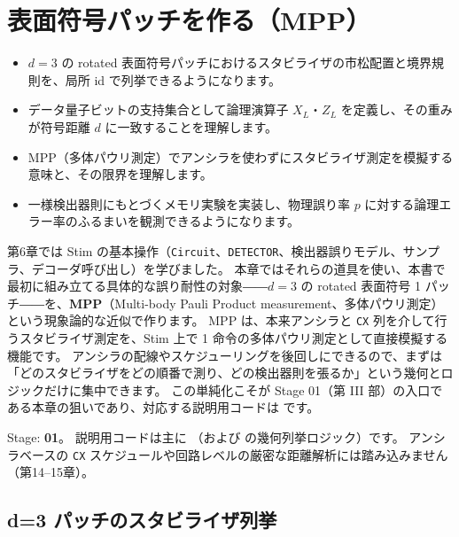 \chapter{表面符号パッチを作る（MPP）}\label{ch:surface_patch}

\begin{chaptergoal}
  \begin{itemize}
  \item $d=3$ の rotated 表面符号パッチにおけるスタビライザの市松配置と境界規則を、局所 id で列挙できるようになります。
  \item データ量子ビットの支持集合として論理演算子 $X_L$・$Z_L$ を定義し、その重みが符号距離 $d$ に一致することを理解します。
  \item MPP（多体パウリ測定）でアンシラを使わずにスタビライザ測定を模擬する意味と、その限界を理解します。
  \item 一様検出器則にもとづくメモリ実験を実装し、物理誤り率 $p$ に対する論理エラー率のふるまいを観測できるようになります。
  \end{itemize}
\end{chaptergoal}

第6章では Stim の基本操作（\texttt{Circuit}、\texttt{DETECTOR}、検出器誤りモデル、サンプラ、デコーダ呼び出し）を学びました。
本章ではそれらの道具を使い、本書で最初に組み立てる具体的な誤り耐性の対象――$d=3$ の rotated 表面符号 1 パッチ――を、\textbf{MPP}（Multi-body Pauli Product measurement、多体パウリ測定）という現象論的な近似で作ります。
MPP は、本来アンシラと \texttt{CX} 列を介して行うスタビライザ測定を、Stim 上で 1 命令の多体パウリ測定として直接模擬する機能です。
アンシラの配線やスケジューリングを後回しにできるので、まずは「どのスタビライザをどの順番で測り、どの検出器則を張るか」という幾何とロジックだけに集中できます。
この単純化こそが Stage 01（第 III 部）の入口である本章の狙いであり、対応する説明用コードは  です。

\begin{notebox}
  Stage: \textbf{01}。
  説明用コードは主に （および  の幾何列挙ロジック）です。
  アンシラベースの \texttt{CX} スケジュールや回路レベルの厳密な距離解析には踏み込みません（第14–15章）。
\end{notebox}

\section{d=3 パッチのスタビライザ列挙}\label{sec:stab_enum}

